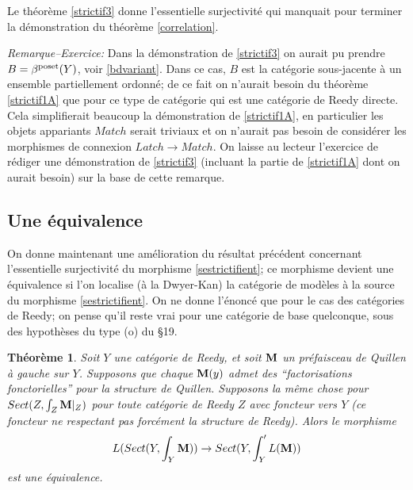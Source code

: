 \documentclass[12pt]{article}
\newcommand{\subnumero}[1]{\subsection*{#1}\phantomsection\addcontentsline{toc}{subsection}{#1}}
\newtheorem{theoreme}[lemma]{Th\'eor\`eme}
\newcommand{\mm}{{\bf M}}
\begin{document}
Le th\'eor\`eme \ref{strictif3} donne l'essentielle surjectivit\'e qui
manquait
pour terminer la d\'e\-mon\-stra\-tion du th\'eor\`eme \ref{correlation}.

{\em Remarque--Exercice:}
\newline
Dans la d\'emonstration de \ref{strictif3} on
aurait pu
prendre $B=\beta ^{\rm poset}(Y)$, voir \ref{bdvariant}. Dans ce cas,
$B$ est la cat\'egorie sous-jacente \`a un ensemble partiellement ordonn\'e;
de ce fait on n'aurait besoin du th\'eor\`eme \ref{strictif1A} que pour ce
type de cat\'egorie qui est une cat\'egorie de Reedy directe. Cela
simplifierait beaucoup la d\'emonstration de \ref{strictif1A}, en particulier
les objets appariants $Match$ serait triviaux et on n'aurait  pas besoin de
consid\'erer les morphismes de connexion $Latch\rightarrow Match$. On laisse au
lecteur l'exercice de r\'ediger une d\'emonstration de \ref{strictif3}
(incluant la partie de \ref{strictif1A} dont on aurait besoin) sur la base de
cette remarque.




\subnumero{Une \'equivalence}

On donne maintenant une am\'elioration du r\'esultat pr\'ec\'edent
concernant
l'essentielle surjectivit\'e du morphisme \ref{sestrictifient}; ce morphisme
devient une
\'equivalence si l'on localise (\`a la Dwyer-Kan) la cat\'egorie de mod\`eles
\`a la source du morphisme \ref{sestrictifient}. On ne donne l'\'enonc\'e
que pour le cas des
cat\'egories de Reedy; on pense qu'il reste vrai pour une cat\'egorie
de base quelconque, sous
des hypoth\`eses du type (o) du \S 19.

\begin{theoreme}
\label{uneequivalence}
Soit $Y$ une cat\'egorie de Reedy, et soit $\mm$ un pr\'efaisceau de Quillen \`a
gauche sur $Y$. Supposons que chaque $\mm (y)$ admet des ``factorisations
fonctorielles'' pour la structure de Quillen. Supposons la m\^eme chose pour
$Sect (Z,\int _Z\mm |_Z)$ pour toute cat\'egorie de Reedy $Z$ avec foncteur
vers $Y$ (ce foncteur ne respectant pas forc\'ement la structure de Reedy).
Alors le
morphisme
$$
L(Sect (Y,\int _Y\mm ))\rightarrow Sect (Y,\int '_YL(\mm ))
$$
est une \'equivalence.
\end{theoreme}
\end{document}
